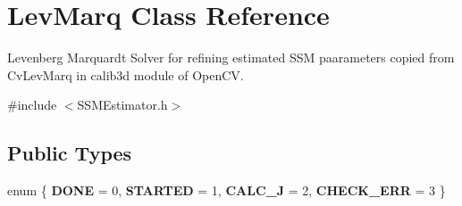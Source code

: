 \hypertarget{classLevMarq}{\section{Lev\-Marq Class Reference}
\label{classLevMarq}
}


Levenberg Marquardt Solver for refining estimated S\-S\-M paarameters copied from Cv\-Lev\-Marq in calib3d module of Open\-C\-V.  




{\ttfamily \#include $<$S\-S\-M\-Estimator.\-h$>$}

\subsection*{Public Types}
\begin{DoxyCompactItemize}
\item 
enum \{ {\bfseries D\-O\-N\-E} = 0, 
{\bfseries S\-T\-A\-R\-T\-E\-D} = 1, 
{\bfseries C\-A\-L\-C\-\_\-\-J} = 2, 
{\bfseries C\-H\-E\-C\-K\-\_\-\-E\-R\-R} = 3
 \}
\end{DoxyCompactItemize}
